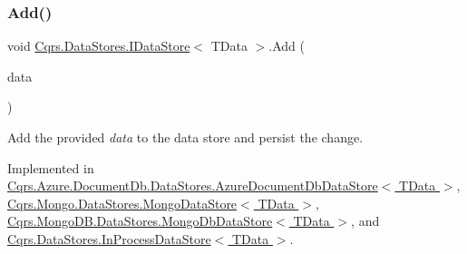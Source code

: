 \mbox{\label{interfaceCqrs_1_1DataStores_1_1IDataStore_a906f3f2f80db7a549a4170eca4653e26_a906f3f2f80db7a549a4170eca4653e26}} 
\subsubsection{\texorpdfstring{Add()}{Add()}\hspace{0.1cm}{\footnotesize\ttfamily [2/2]}}
{\footnotesize\ttfamily void \hyperlink{interfaceCqrs_1_1DataStores_1_1IDataStore}{Cqrs.\+Data\+Stores.\+I\+Data\+Store}$<$ T\+Data $>$.Add (\begin{DoxyParamCaption}\item[{I\+Enumerable$<$ T\+Data $>$}]{data }\end{DoxyParamCaption})}



Add the provided {\itshape data}  to the data store and persist the change. 



Implemented in \hyperlink{classCqrs_1_1Azure_1_1DocumentDb_1_1DataStores_1_1AzureDocumentDbDataStore_a2d91050f17273687e44a121623803e7a_a2d91050f17273687e44a121623803e7a}{Cqrs.\+Azure.\+Document\+Db.\+Data\+Stores.\+Azure\+Document\+Db\+Data\+Store$<$ T\+Data $>$}, \hyperlink{classCqrs_1_1Mongo_1_1DataStores_1_1MongoDataStore_a38c242b255dc17cf8d19470fdf5a99bf_a38c242b255dc17cf8d19470fdf5a99bf}{Cqrs.\+Mongo.\+Data\+Stores.\+Mongo\+Data\+Store$<$ T\+Data $>$}, \hyperlink{classCqrs_1_1MongoDB_1_1DataStores_1_1MongoDbDataStore_a709fc1e29d266a7c19a46bd181d03963_a709fc1e29d266a7c19a46bd181d03963}{Cqrs.\+Mongo\+D\+B.\+Data\+Stores.\+Mongo\+Db\+Data\+Store$<$ T\+Data $>$}, and \hyperlink{classCqrs_1_1DataStores_1_1InProcessDataStore_ad62504e478f0a907c18ec4aa9b42703a_ad62504e478f0a907c18ec4aa9b42703a}{Cqrs.\+Data\+Stores.\+In\+Process\+Data\+Store$<$ T\+Data $>$}.

\mbox{\label{interfaceCqrs_1_1DataStores_1_1IDataStore_aa7ade96f2f3151d5353cf7bdbb2baec5_aa7ade96f2f3151d5353cf7bdbb2baec5}} 
